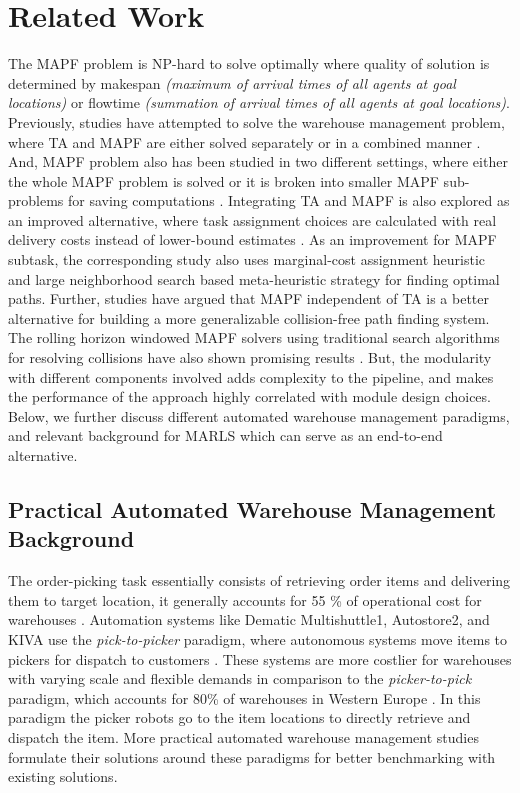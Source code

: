 \documentclass{article}
\begin{document}
\section{Related Work}


The MAPF problem is NP-hard to solve optimally where quality of solution is determined by makespan \textit{(maximum of arrival times of all agents at goal locations)} or flowtime \textit{(summation of arrival times of all agents at goal locations)}.
Previously, studies have attempted to solve the warehouse management problem, where TA and MAPF are either solved separately or in a combined manner \cite{korsah2013comprehensive}.
And, MAPF problem also has been studied in two different settings, where either the whole MAPF problem is solved or it is broken into smaller MAPF sub-problems for saving computations \cite{stern2019multi}.
Integrating TA and MAPF is also explored as an improved alternative, where task assignment choices are calculated with real delivery costs instead of lower-bound estimates \cite{chen2021integrated}.
As an improvement for MAPF subtask, the corresponding study also uses marginal-cost assignment heuristic and large neighborhood search based meta-heuristic strategy for finding optimal paths.
Further, studies have argued that MAPF independent of TA is a better alternative for building a more generalizable collision-free path finding system.
The rolling horizon windowed MAPF solvers using traditional search algorithms for resolving collisions have also shown promising results \cite{li2021lifelong}.
But, the modularity with different components involved adds complexity to the pipeline, and makes the performance of the approach highly correlated with module design choices.
Below, we further discuss different automated warehouse management paradigms, and relevant background for MARLS which can serve as an end-to-end alternative.


\subsection{Practical Automated Warehouse Management Background} \label{warehouse-problem-background}


The order-picking task essentially consists of retrieving order items and delivering them to target location, it generally accounts for 55 \% of operational cost for warehouses \cite{drury1988towards}.
Automation systems like Dematic Multishuttle1, Autostore2, and KIVA use the \textit{pick-to-picker} paradigm, where autonomous systems move items to pickers for dispatch to customers \cite{wurman2008coordinating}.
These systems are more costlier for warehouses with varying scale and flexible demands in comparison to the \textit{picker-to-pick} paradigm, which accounts for 80\% of warehouses in Western Europe \cite{de2007design}.
In this paradigm the picker robots go to the item locations to directly retrieve and dispatch the item.
More practical automated warehouse management studies formulate their solutions around these paradigms for better benchmarking with existing solutions.
\end{document}
